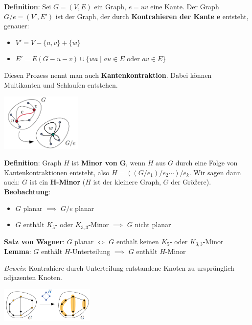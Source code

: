 \textbf{Definition}: Sei $G=(V,E)$ ein Graph, $e=uv$ eine Kante. Der Graph $G/e=(V',E')$ ist der Graph, der durch \textbf{Kontrahieren der Kante} $\boldsymbol{e}$ entsteht, genauer:
\begin{itemize}
	\item $V'=V-\{u,v\}+\{w\}$
	\item $E'=E(G-u-v)\cup\{wa\mid au\in E \text{ oder } av\in E\}$
\end{itemize}
Diesen Prozess nennt man auch \textbf{Kantenkontraktion}. Dabei können Multikanten und Schlaufen entstehen.
\begin{center}
	\includegraphics[width=0.3\textwidth]{images/kantenkontraktion.png}
\end{center}
\bigskip
\textbf{Definition}: Graph $H$ ist \textbf{Minor von} $\boldsymbol{G}$, wenn $H$ aus $G$ durch eine Folge von Kantenkontraktionen entsteht, also $H=((G/e_1)/e_2\cdots)/e_k$. Wir sagen dann auch: $G$ ist ein \textbf{$\boldsymbol{H}$-Minor} ($H$ ist der kleinere Graph, $G$ der Größere).\\

\textbf{Beobachtung}:
\begin{itemize}
	\item $G$ planar $\implies$ $G/e$ planar
	\item $G$ enthält $K_5$- oder $K_{3,3}$-Minor $\implies$ $G$ nicht planar
\end{itemize}
\bigskip
\textbf{Satz von Wagner}: $G$ planar $\iff$ $G$ enthält keinen $K_5$- oder $K_{3,3}$-Minor\\

\textbf{Lemma}: $G$ enthält $H$-Unterteilung $\implies $ $G$ enthält $H$-Minor

\textit{Beweis}: Kontrahiere durch Unterteilung entstandene Knoten zu ursprünglich adjazenten Knoten.
\begin{center}
	\includegraphics[width=0.35\textwidth]{images/um-skizze.png}
\end{center}
\pagebreak

